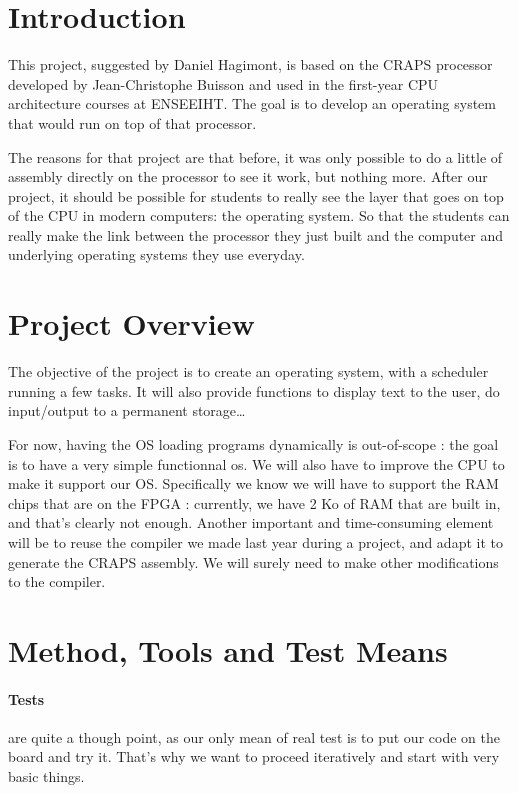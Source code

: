 \documentclass{article}
\begin{document}
  \section{Introduction}
    This project, suggested by Daniel Hagimont, is based on the CRAPS processor
    developed by Jean-Christophe Buisson and used in the first-year CPU
    architecture courses at ENSEEIHT. The goal is to develop an operating
    system that would run on top of that processor. 

    The reasons for that project are that before, it was only possible to do a
    little of assembly directly on the processor to see it work, but nothing
    more.  After our project, it should be possible for students to really see
    the layer that goes on top of the CPU in modern computers: the operating
    system. So that the students can really make the link between the processor
    they just built and the computer and underlying operating systems they use
    everyday.


  \section{Project Overview}
    The objective of the project is to create an operating system, with a
    scheduler running a few tasks. It will also provide functions to display
    text to the user, do input/output to a permanent storage\dots

    For now, having the OS loading programs dynamically is out-of-scope : the
    goal is to have a very simple functionnal os.  We will also have to improve
    the CPU to make it support our OS. Specifically we know we will have to
    support the RAM chips that are on the FPGA : currently, we have 2 Ko of RAM
    that are built in, and that's clearly not enough.  Another important and
    time-consuming element will be to reuse the compiler we made last year
    during a project, and adapt it to generate the CRAPS assembly. We will
    surely need to make other modifications to the compiler.

  \section{Method, Tools and Test Means}
    \paragraph{Tests} are quite a though point, as our only mean of real test is
    to put our code on the board and try it. That's why we want to proceed
    iteratively and start with very basic things.
\end{document}
